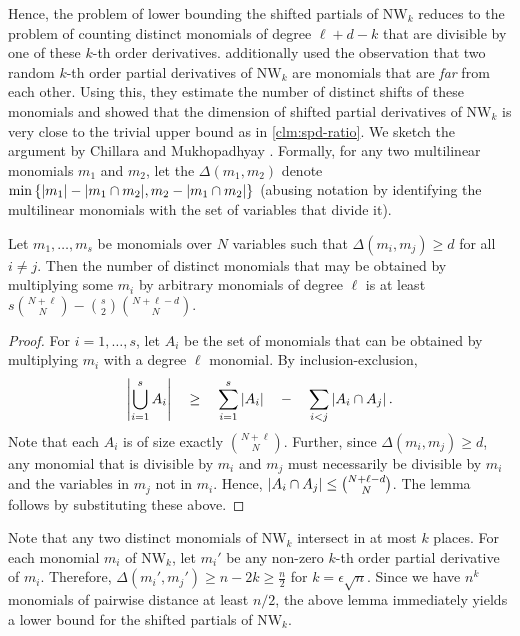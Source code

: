 Hence, the problem of lower bounding the shifted partials of $\mathrm{NW}_k$ reduces to the problem of counting distinct monomials of degree $\ell + d-k$ that are divisible by one of these $k$-th order derivatives. \cite{KSS13} additionally used the observation that two random $k$-th order partial derivatives of $\mathrm{NW}_k$ are monomials that are \emph{far} from each other. 
Using this, they estimate the number of distinct shifts of these monomials and showed that the dimension of shifted partial derivatives of $\mathrm{NW}_k$ is very close to the trivial upper bound as in \autoref{clm:spd-ratio}. 
We sketch the argument by Chillara and Mukhopadhyay \cite{cm14}. 
Formally, for any two multilinear monomials $m_1$ and $m_2$, let the $\Delta(m_1,m_2)$ denote $\min\left\{|m_1| - |m_1\cap m_2|, m_2 - |m_1 \cap m_2|\right\}$ (abusing notation by identifying the multilinear monomials with the set of variables that divide it). 

\begin{lemma}[\cite{cm14}]\label{lem:cm-inc-exc}
Let $m_1,\dots, m_s$ be monomials over $N$ variables such that $\Delta(m_i, m_j) \geq d$ for all $i\neq j$. 
Then the number of distinct monomials that may be obtained by multiplying some $m_i$ by arbitrary monomials of degree $\ell$ is at least $s \binom{N+\ell}{N} - \binom{s}{2} \binom{N+\ell - d}{N}$. 
\end{lemma}
\begin{proof}
For $i = 1,\dots, s$, let $A_i$ be the set of monomials that can be obtained by multiplying $m_i$ with a degree $\ell$ monomial. 
By inclusion-exclusion, 
$$
\left|\bigcup_{i=1}^s A_i\right| \quad \geq \quad \sum_{i=1}^s \left|A_i\right| \quad - \quad \sum_{i<j} \left|A_i \cap A_j\right|.
$$
Note that each $A_i$ is of size exactly $\binom{N+\ell}{N}$. 
Further, since $\Delta(m_i, m_j) \geq d$, any monomial that is divisible by $m_i$ and $m_j$ must necessarily be divisible by $m_i$ and the variables in $m_j$ not in $m_i$. 
Hence, $\left|A_i\cap A_j\right| \leq \binom{N + \ell - d}{N}$. 
The lemma follows by substituting these above. 
\end{proof}

Note that any two distinct monomials of $\mathrm{NW}_k$ intersect in at most $k$ places. 
For each monomial $m_i$ of $\mathrm{NW}_k$, let $m_i'$ be any non-zero $k$-th order partial derivative of $m_i$. 
Therefore, $\Delta(m_i', m_j') \geq n -2k \geq \frac{n}{2}$ for $k = \epsilon \sqrt{n}$. 
Since we have $n^k$ monomials of pairwise distance at least $n/2$, the above lemma immediately yields a lower bound for the shifted partials of $\mathrm{NW}_k$. 

